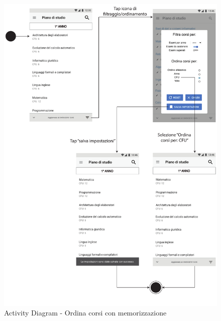 \begin{figure}
	\centering
	\includegraphics[width=6in]{imgs/gruppo1/activity_diagrams/AD4_ordina_corsi.pdf}
	\caption{Activity Diagram - Ordina corsi con memorizzazione}
	\label{diag:ordinaCorsiConMemAD}
\end{figure}
\newpage
\clearpage

